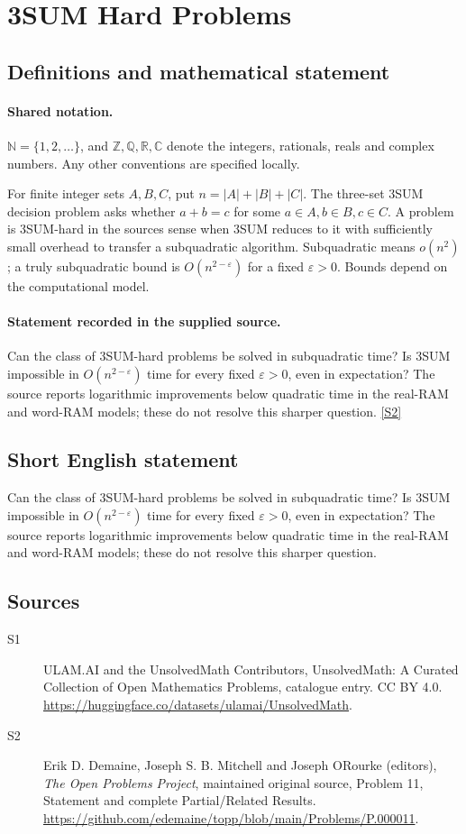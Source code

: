 \documentclass[11pt]{article}
\newcommand{\sref}[2]{\hyperlink{source:#1:#2}{[S#2]}}
\begin{document}
\section{3SUM Hard Problems}\label{statement}

\subsection{Definitions and mathematical statement}

\paragraph{Shared notation.}$\mathbb N=\{1,2,\ldots\}$, and $\mathbb Z,\mathbb Q,\mathbb R,\mathbb C$ denote the integers, rationals, reals and complex numbers. Any other conventions are specified locally.


For finite integer sets $A,B,C$, put $n=|A|+|B|+|C|$. The three-set 3SUM decision problem asks whether $a+b=c$ for some $a\in A,b\in B,c\in C$. A problem is 3SUM-hard in the source\textquotesingle s sense when 3SUM reduces to it with sufficiently small overhead to transfer a subquadratic algorithm. Subquadratic means $o(n^2)$; a truly subquadratic bound is $O(n^{2-\varepsilon})$ for a fixed $\varepsilon>0$. Bounds depend on the computational model.
\paragraph{Statement recorded in the supplied source.}
Can the class of 3SUM-hard problems be solved in subquadratic time? Is 3SUM impossible in $O(n^{2-\varepsilon})$ time for every fixed $\varepsilon>0$, even in expectation? The source reports logarithmic improvements below quadratic time in the real-RAM and word-RAM models; these do not resolve this sharper question. \sref{statement}{2}
\subsection{Short English statement}
Can the class of 3SUM-hard problems be solved in subquadratic time? Is 3SUM impossible in $O(n^{2-\varepsilon})$ time for every fixed $\varepsilon>0$, even in expectation? The source reports logarithmic improvements below quadratic time in the real-RAM and word-RAM models; these do not resolve this sharper question.
\subsection{Sources}
\begin{description}
\item[\hypertarget{source:statement:1}{S1}] ULAM.AI and the UnsolvedMath Contributors, UnsolvedMath: A Curated Collection of Open Mathematics Problems, catalogue entry. CC BY 4.0. \url{https://huggingface.co/datasets/ulamai/UnsolvedMath}.
\item[\hypertarget{source:statement:2}{S2}] Erik D. Demaine, Joseph S. B. Mitchell and Joseph O\textquotesingle Rourke (editors), \emph{The Open Problems Project}, maintained original source, Problem 11, Statement and complete Partial/Related Results. \url{https://github.com/edemaine/topp/blob/main/Problems/P.000011}.
\end{description}
\label{end:statement}
\end{document}
